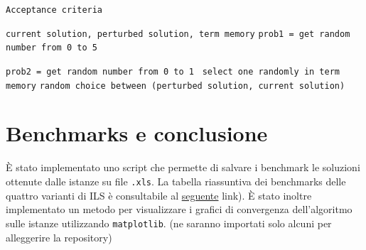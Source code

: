 \documentclass[11pt]{article}
\begin{document}
\begin{algorithm}
\caption{\texttt{Acceptance criteria}}
\begin{algorithmic}
    \Require \texttt{current solution, perturbed solution, term memory}
    \State \texttt{prob1 = get random number from 0 to 5}

            \State \texttt{prob2 = get random number from 0 to 1}
                \Return \texttt{ select one randomly in term memory}
            \EndIf
        \EndIf
    \EndIf
    \State \Return \texttt{random choice between (perturbed solution, current solution)}
\end{algorithmic}
\end{algorithm}

\pagebreak

\section{Benchmarks e conclusione}

È stato implementato uno script che permette di salvare i benchmark le soluzioni ottenute dalle istanze su  file \verb|.xls|.
La tabella riassuntiva dei benchmarks delle quattro varianti di ILS è consultabile al \href{https://github.com/khalld/mwvc-using-ils/tree/main/benchmarks}{seguente} link). È stato inoltre implementato un metodo per visualizzare i grafici di convergenza dell'algoritmo sulle istanze utilizzando \verb|matplotlib|. (ne saranno importati solo alcuni per alleggerire la repository)
\end{document}
